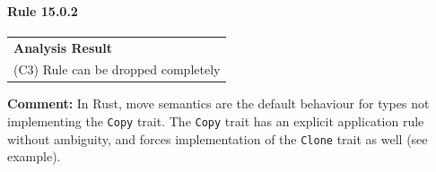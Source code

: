 \paragraph{Rule 15.0.2}
\begin{longtable}{p{13cm}}
\textbf{Analysis Result} \\
(C3) Rule can be dropped completely \\
\end{longtable}
\textbf{Comment:} In Rust, move semantics are the default behaviour for types not implementing the \texttt{Copy} trait. The \texttt{Copy} trait has an explicit application rule without ambiguity, and forces implementation of the \texttt{Clone} trait as well (see example). \\



